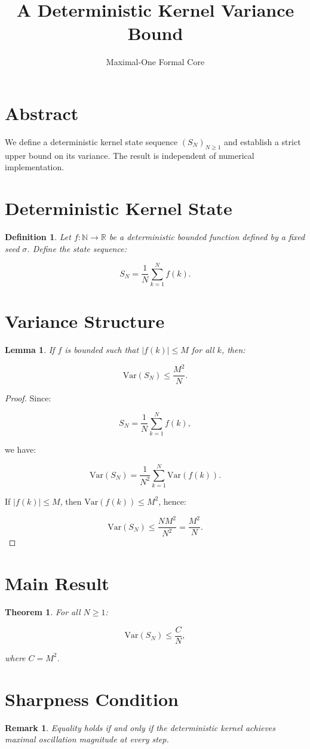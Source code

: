 \documentclass{article}
\title{A Deterministic Kernel Variance Bound}
\author{Maximal-One Formal Core}
\date{}
\newtheorem{definition}{Definition}
\newtheorem{theorem}{Theorem}
\newtheorem{lemma}{Lemma}
\newtheorem{remark}{Remark}
\begin{document}
\maketitle

\section*{Abstract}

We define a deterministic kernel state sequence $(S_N)_{N \ge 1}$ 
and establish a strict upper bound on its variance. 
The result is independent of numerical implementation.

\section{Deterministic Kernel State}

\begin{definition}
Let $f : \mathbb{N} \to \mathbb{R}$ be a deterministic bounded function 
defined by a fixed seed $\sigma$.
Define the state sequence:

\[
S_N = \frac{1}{N} \sum_{k=1}^{N} f(k).
\]

\end{definition}

\section{Variance Structure}

\begin{lemma}
If $f$ is bounded such that $|f(k)| \le M$ for all $k$, 
then:

\[
\mathrm{Var}(S_N) \le \frac{M^2}{N}.
\]

\end{lemma}

\begin{proof}

Since:

\[
S_N = \frac{1}{N} \sum_{k=1}^{N} f(k),
\]

we have:

\[
\mathrm{Var}(S_N) = \frac{1}{N^2} \sum_{k=1}^{N} \mathrm{Var}(f(k)).
\]

If $|f(k)| \le M$, then $\mathrm{Var}(f(k)) \le M^2$,
hence:

\[
\mathrm{Var}(S_N) \le \frac{N M^2}{N^2}
= \frac{M^2}{N}.
\]

\end{proof}

\section{Main Result}

\begin{theorem}
For all $N \ge 1$:

\[
\mathrm{Var}(S_N) \le \frac{C}{N},
\]

where $C = M^2$.
\end{theorem}

\section{Sharpness Condition}

\begin{remark}
Equality holds if and only if the deterministic kernel 
achieves maximal oscillation magnitude at every step.
\end{remark}
\end{document}
